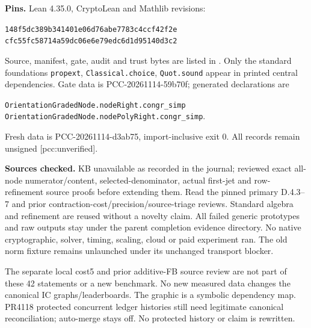 \documentclass[10pt]{article}
\begin{document}
\textbf{Pins.} Lean 4.35.0, CryptoLean and Mathlib revisions:
\begin{center}\small
\texttt{148f5dc389b341401e06d76abe7783c4ccf42f2e}\\
\texttt{cfc55fc58714a59dc06e6e79edc6d1d95140d3c2}
\end{center}
Source, manifest, gate, audit and trust bytes are listed in
. Only the standard foundations
\texttt{propext}, \texttt{Classical.choice}, \texttt{Quot.sound} appear in
printed central dependencies. Gate data is PCC-20261114-59b70f; generated declarations are
\begin{center}\small
\texttt{OrientationGradedNode.nodeRight.congr\_simp}\\
\texttt{OrientationGradedNode.nodePolyRight.congr\_simp}.
\end{center}
Fresh data is PCC-20261114-d3ab75, import-inclusive exit 0.
All records remain unsigned [pcc:unverified].

\textbf{Sources checked.} KB unavailable as recorded in the journal;
reviewed exact all-node numerator/content, selected-denominator, actual
first-jet and row-refinement source proofs before extending them. Read the
pinned primary D.4.3--7 and prior contraction-cost/precision/source-triage
reviews. Standard algebra and refinement are reused without a novelty claim.
All failed generic prototypes and raw outputs stay under the parent completion
evidence directory. No native cryptographic, solver, timing, scaling, cloud
or paid experiment ran. The old norm fixture remains unlaunched under its
unchanged transport blocker.

The separate local cost5 and prior additive-FB source review are not part of
these 42 statements or a new benchmark. No new measured data changes the
canonical IC graphs/leaderboards. The graphic is a symbolic dependency map.
PR4118 protected concurrent ledger histories still need legitimate canonical
reconciliation; auto-merge stays off. No protected history or claim is rewritten.
\end{document}
